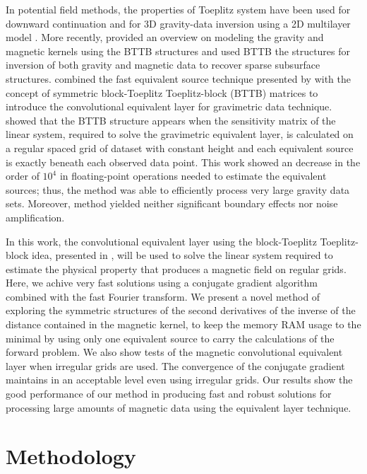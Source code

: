 \documentclass[manuscript]{geophysics}
\begin{document}
	In potential field methods, the properties of Toeplitz system have been used for downward continuation \citep{zhang-etal2016} and for 3D gravity-data inversion using a 2D multilayer model \citep{zhang-wong2015}. More recently, \cite{hogue2020tutorial} provided an overview on modeling the gravity and magnetic kernels using the BTTB structures and \cite{renaut2020fast} used BTTB the structures for inversion of both gravity and magnetic data to recover sparse subsurface structures.
	\cite{takahashi2020convolutional} combined the fast equivalent source technique presented by \cite{siqueira-etal2017} with the concept of symmetric block-Toeplitz Toeplitz-block (BTTB) matrices to introduce the convolutional equivalent layer for gravimetric data technique. 
	\cite{takahashi2020convolutional} showed that the BTTB structure appears when the sensitivity matrix of the linear system, required to solve the gravimetric equivalent layer, is calculated on a regular spaced grid of dataset with constant height and each equivalent source is exactly beneath each observed data point. 
	This work showed an decrease in the order of $10^4$ in floating-point operations needed to estimate the equivalent sources; thus, the \cite{takahashi2020convolutional} method was able to efficiently process very large gravity data sets. 
	Moreover, \cite{takahashi2020convolutional} method yielded neither significant boundary effects nor noise amplification.
	
	In this work, the convolutional equivalent layer using the block-Toeplitz Toeplitz-block idea, presented in \cite{takahashi2020convolutional}, will be used to solve the linear system required to estimate the physical property that produces a magnetic field on regular grids. 
	Here, we achive very fast solutions using a conjugate gradient algorithm combined with the fast Fourier transform. We present a novel method of exploring the symmetric structures of the second derivatives of the inverse of the distance contained in the magnetic kernel, to keep the memory RAM usage to the minimal by using only one equivalent source to carry the calculations of the forward problem. We also show tests of the magnetic convolutional equivalent layer when irregular grids are used. The convergence of the conjugate gradient maintains in an acceptable level even using irregular grids. 
	Our results show the good performance of our method in producing fast and robust solutions for processing large amounts of magnetic data using the equivalent layer technique.
	
	\section{Methodology}
	
\end{document}
